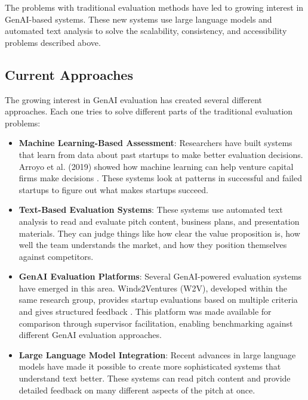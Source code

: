 The problems with traditional evaluation methods have led to growing interest in GenAI-based systems. These new systems use large language models and automated text analysis to solve the scalability, consistency, and accessibility problems described above.

\subsection{Current Approaches}\label{subsec:current-approaches}
The growing interest in GenAI evaluation has created several different approaches. Each one tries to solve different parts of the traditional evaluation problems:

\begin{itemize}
    \item \textbf{Machine Learning-Based Assessment}: Researchers have built systems that learn from data about past startups to make better evaluation decisions. Arroyo et al. (2019) showed how machine learning can help venture capital firms make decisions \cite{Arroyo2019}. These systems look at patterns in successful and failed startups to figure out what makes startups succeed.

    \item \textbf{Text-Based Evaluation Systems}: These systems use automated text analysis to read and evaluate pitch content, business plans, and presentation materials. They can judge things like how clear the value proposition is, how well the team understands the market, and how they position themselves against competitors.

    \item \textbf{GenAI Evaluation Platforms}: Several GenAI-powered evaluation systems have emerged in this area. Winds2Ventures (W2V), developed within the same research group, provides startup evaluations based on multiple criteria and gives structured feedback \cite{w2v}. This platform was made available for comparison through supervisor facilitation, enabling benchmarking against different GenAI evaluation approaches.

    \item \textbf{Large Language Model Integration}: Recent advances in large language models have made it possible to create more sophisticated systems that understand text better. These systems can read pitch content and provide detailed feedback on many different aspects of the pitch at once.
\end{itemize}


